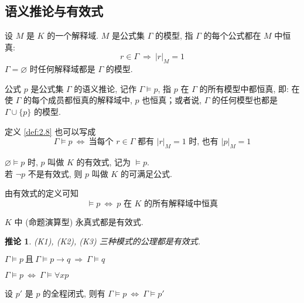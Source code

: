 \documentclass[
    mode=hazy,
    color=blue,
    device=normal,
    lang=cn
]{elegantnote}
\newtheorem{deduction}{推论}[section]
\begin{document}
\subsection{语义推论与有效式}
\begin{definition}[模型]
    设 $M$ 是 $K$ 的一个解释域.  $M$ 是公式集 $\Gamma$ 的模型, 指 $\Gamma$ 的每个公式都在 $M$ 中恒真:
    $$
        r\in \Gamma\ \Rightarrow\  \lvert r\rvert_M=1
    $$
    $\Gamma=\varnothing$ 时任何解释域都是 $\Gamma$ 的模型.
\end{definition}
\begin{definition}[语义推论]\label{def:2.8}
    公式 $p$ 是公式集 $\Gamma$ 的语义推论, 记作 $\Gamma\vDash p$, 指 $p$ 在 $\Gamma$ 的所有模型中都恒真, 即: 在使 $\Gamma$ 的每个成员都恒真的解释域中, $p$ 也恒真；或者说, $\Gamma$ 的任何模型也都是 $\Gamma\cup \{p\}$ 的模型.
\end{definition}
定义 \ref{def:2.8} 也可以写成
$$
    \Gamma\vDash p\ \Leftrightarrow\ \text{当每个 $r\in\Gamma$ 都有 $\lvert r\rvert_M=1$ 时, 也有 $\lvert p\rvert_M = 1$}
$$
\begin{definition}[有效式与满足公式]
    $\varnothing\vDash p$ 时, $p$ 叫做 $K$ 的有效式, 记为 $\vDash p$.\\
    若 $\lnot p$ 不是有效式, 则 $p$ 叫做 $K$ 的可满足公式.
\end{definition}
由有效式的定义可知
$$
    \vDash p \ \Leftrightarrow\ \text{$p$ 在 $K$ 的所有解释域中恒真}
$$
\begin{proposition}
    $K$ 中 (命题演算型) 永真式都是有效式.
\end{proposition}
\begin{deduction}
    (K1), (K2), (K3) 三种模式的公理都是有效式.
\end{deduction}
\begin{proposition}
    $\Gamma\vDash p\ \text{且}\ \Gamma\vDash p\to q\ \Rightarrow\  \Gamma\vDash q$
\end{proposition}
\begin{proposition}
    $\Gamma\vDash p\ \Leftrightarrow\ \Gamma\vDash\forall xp$
\end{proposition}
\begin{proposition}
    设 $p'$ 是 $p$ 的全程闭式, 则有 $\Gamma\vDash p\ \Leftrightarrow\  \Gamma\vDash p'$
\end{proposition}
\end{document}
